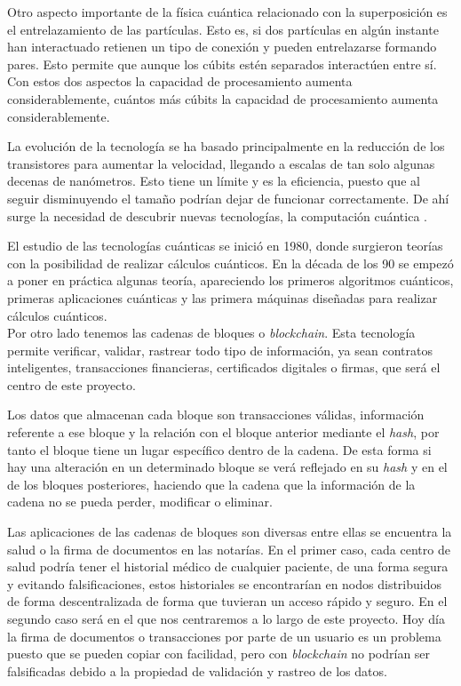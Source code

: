 \begin{itemize}
Otro aspecto importante de la física cuántica relacionado con la superposición es el entrelazamiento de las partículas\cite{cumputacioncuanticaclasica}. Esto es, si dos partículas en algún instante han interactuado retienen un tipo de conexión y pueden entrelazarse formando pares. Esto permite que aunque los cúbits estén separados interactúen entre sí. Con estos dos aspectos la capacidad de procesamiento aumenta considerablemente, cuántos más cúbits la capacidad de procesamiento aumenta considerablemente.


La evolución de la tecnología se ha basado principalmente en la reducción de los transistores para aumentar la velocidad, llegando a escalas de tan solo algunas decenas de nanómetros. Esto tiene un límite y es la eficiencia, puesto que al seguir disminuyendo el tamaño podrían dejar de funcionar correctamente. De ahí surge la necesidad de descubrir nuevas tecnologías, la computación cuántica \cite{computacioncuanticawiki}.

El estudio de las tecnologías cuánticas se inició en 1980, donde surgieron teorías con la posibilidad de realizar cálculos cuánticos. En la década de los 90 se empezó a poner en práctica algunas teoría, apareciendo los primeros algoritmos cuánticos, primeras aplicaciones cuánticas y las primera máquinas diseñadas para realizar cálculos cuánticos.\\



Por otro lado tenemos las cadenas de bloques o \textit{blockchain}. Esta tecnología permite verificar, validar, rastrear todo tipo de información, ya sean contratos inteligentes, transacciones financieras, certificados digitales o firmas, que será el centro de este proyecto.

Los datos que almacenan cada bloque son transacciones válidas, información referente a ese bloque y la relación con el bloque anterior mediante el \textit{hash}, por tanto el bloque tiene un lugar específico dentro de la cadena. De esta forma si hay una alteración en un determinado bloque se verá reflejado en su \textit{hash} y en el de los bloques posteriores, haciendo que la cadena que la información de la cadena no se pueda perder, modificar o eliminar. 

Las aplicaciones de las cadenas de bloques son diversas entre ellas se encuentra la salud o la firma de documentos en las notarías. En el primer caso, cada centro  de salud podría tener el historial médico de cualquier paciente, de una forma segura y evitando falsificaciones, estos historiales se encontrarían en nodos distribuidos de forma descentralizada de forma que tuvieran un acceso rápido y seguro. En el segundo caso será en el que nos centraremos a lo largo de este proyecto. Hoy día la firma de documentos o transacciones por parte de un usuario es un problema puesto que se pueden copiar con facilidad, pero con \textit{blockchain} no podrían ser falsificadas debido a la propiedad de validación y rastreo de los datos.\\


\end{itemize}
